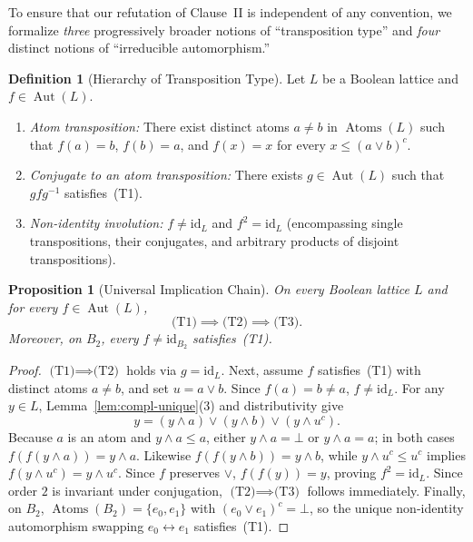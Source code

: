 \documentclass[11pt]{article}
\newtheorem{proposition}[theorem]{Proposition}
\theoremstyle{definition}
\newtheorem{definition}[theorem]{Definition}
\theoremstyle{remark}
\newcommand{\Aut}{\operatorname{Aut}}
\newcommand{\Atoms}{\operatorname{Atoms}}
\newcommand{\id}{\mathrm{id}}
\begin{document}
To ensure that our refutation of Clause~II is independent of any convention, we formalize \emph{three} progressively broader notions of ``transposition type'' and \emph{four} distinct notions of ``irreducible automorphism.''

\begin{definition}[Hierarchy of Transposition Type]
\label{def:transposition-type}
Let $L$ be a Boolean lattice and $f \in \Aut(L)$.
\begin{enumerate}
  \item[\textbf{(T1)}] \emph{Atom transposition:} There exist distinct atoms $a \neq b$ in $\Atoms(L)$ such that $f(a) = b$, $f(b) = a$, and $f(x) = x$ for every $x \le (a \vee b)^c$.
  \item[\textbf{(T2)}] \emph{Conjugate to an atom transposition:} There exists $g \in \Aut(L)$ such that $g f g^{-1}$ satisfies~(T1).
  \item[\textbf{(T3)}] \emph{Non-identity involution:} $f \neq \id_L$ and $f^2 = \id_L$ (encompassing single transpositions, their conjugates, and arbitrary products of disjoint transpositions).
\end{enumerate}
\end{definition}

\begin{proposition}[Universal Implication Chain]
\label{prop:trans-chain}
On \emph{every} Boolean lattice $L$ and for every $f \in \Aut(L)$,
\[
  \text{(T1)} \implies \text{(T2)} \implies \text{(T3)}.
\]
Moreover, on $B_2$, every $f \neq \id_{B_2}$ satisfies~(T1).
\end{proposition}
\begin{proof}
$\text{(T1)} \implies \text{(T2)}$ holds via $g = \id_L$. Next, assume $f$ satisfies~(T1) with distinct atoms $a \neq b$, and set $u = a \vee b$. Since $f(a) = b \neq a$, $f \neq \id_L$. For any $y \in L$, Lemma~\ref{lem:compl-unique}(3) and distributivity give
\[
  y = (y \wedge a) \vee (y \wedge b) \vee (y \wedge u^c).
\]
Because $a$ is an atom and $y \wedge a \le a$, either $y \wedge a = \bot$ or $y \wedge a = a$; in both cases $f(f(y \wedge a)) = y \wedge a$. Likewise $f(f(y \wedge b)) = y \wedge b$, while $y \wedge u^c \le u^c$ implies $f(y \wedge u^c) = y \wedge u^c$. Since $f$ preserves $\vee$, $f(f(y)) = y$, proving $f^2 = \id_L$. Since order $2$ is invariant under conjugation, $\text{(T2)} \implies \text{(T3)}$ follows immediately. Finally, on $B_2$, $\Atoms(B_2) = \{e_0, e_1\}$ with $(e_0 \vee e_1)^c = \bot$, so the unique non-identity automorphism swapping $e_0 \leftrightarrow e_1$ satisfies~(T1).
\end{proof}
\end{document}
